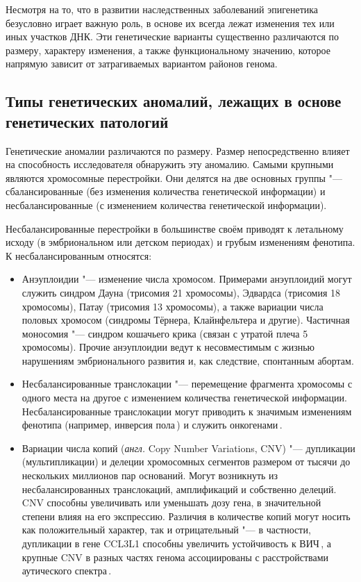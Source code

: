 \documentclass[a4paper,14pt]{extarticle}
\newcommand{\anglia}[1]{\textit{англ.} \textenglish{#1}}
\begin{document}
Несмотря на то, что в развитии наследственных заболеваний эпигенетика безусловно играет важную роль, в основе их всегда лежат изменения тех или иных участков ДНК.
Эти генетические варианты существенно различаются по размеру, характеру изменения, а также функциональному значению, которое напрямую зависит от затрагиваемых вариантом районов генома.

\subsection{Типы генетических аномалий, лежащих в основе генетических патологий}

Генетические аномалии различаются по размеру.
Размер непосредственно влияет на способность исследователя обнаружить эту аномалию.
Самыми крупными являются хромосомные перестройки.
Они делятся на две основных группы "--- сбалансированные (без изменения количества генетической информации) и несбалансированные (с изменением количества генетической информации).

Несбалансированные перестройки в большинстве своём приводят к летальному исходу (в эмбриональном или детском периодах) и грубым изменениям фенотипа.
К несбалансированным относятся:

\begin{itemize}
\item Анэуплоидии "--- изменение числа хромосом.
Примерами анэуплоидий могут служить синдром Дауна (трисомия 21 хромосомы), Эдвардса (трисомия 18 хромосомы), Патау (трисомия 13 хромосомы), а также вариации числа половых хромосом (синдромы Тёрнера, Клайнфельтера и другие).
Частичная моносомия "--- синдром кошачьего крика (связан с утратой плеча 5 хромосомы).
Прочие анэуплоидии ведут к несовместимым с жизнью нарушениям эмбрионального развития и, как следствие, спонтанным абортам.
\item Несбалансированные транслокации "--- перемещение фрагмента хромосомы с одного места на другое с изменением количества генетической информации.
Несбалансированные транслокации могут приводить к значимым изменениям фенотипа (например, инверсия пола\,\cite{Rizvi_2008}) и служить онкогенами\,\cite{O_Connor_2008}.
\item Вариации числа копий (\anglia{Copy Number Variations, CNV}) "--- дупликации (мультипликации) и делеции хромосомных сегментов размером от тысячи до нескольких миллионов пар оснований.
Могут возникнуть из несбалансированных транслокаций, амплификаций и собственно делеций.
CNV способны увеличивать или уменьшать дозу гена, в значительной степени влияя на его экспрессию.
Различия в количестве копий могут носить как положительный характер, так и отрицательный "--- в частности, дупликации в гене CCL3L1 способны увеличить устойчивость к ВИЧ\,\cite{Gonzalez_2005}, а крупные CNV в разных частях генома ассоциированы с расстройствами аутического спектра\,\cite{Sebat_2007}.
\end{itemize}
\end{document}
